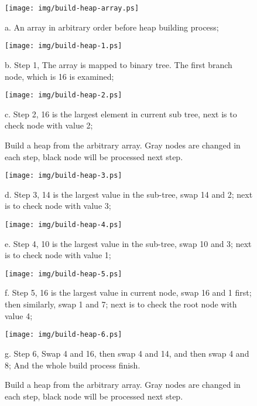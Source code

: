 \documentclass{article}
\begin{document}
\begin{figure}[htbp]
  \begin{center}
    \texttt{[image: img/build-heap-array.ps]}

    a. An array in arbitrary order before heap building process;

    \texttt{[image: img/build-heap-1.ps]}

    b. Step 1, The array is mapped to binary tree. The first branch node, which is
16 is examined;

    \texttt{[image: img/build-heap-2.ps]}

    c. Step 2, 16 is the largest element in current sub tree, next is to check node
with value 2;

    \caption{Build a heap from the arbitrary array. Gray nodes are changed in each step,
black node will be processed next step.} \label{fig:build-heap-1}
  \end{center}
\end{figure}

\begin{figure}[htbp]
  \begin{center}
    \texttt{[image: img/build-heap-3.ps]}

    d. Step 3, 14 is the largest value in the sub-tree, swap 14 and 2; next is to check
node with value 3;

    \texttt{[image: img/build-heap-4.ps]}

    e. Step 4, 10 is the largest value in the sub-tree, swap 10 and 3; next is to check
node with value 1;

    \texttt{[image: img/build-heap-5.ps]}

    f. Step 5, 16 is the largest value in current node, swap 16 and 1 first; then
similarly, swap 1 and 7; next is to check the root node with value 4;

    \texttt{[image: img/build-heap-6.ps]}

    g. Step 6, Swap 4 and 16, then swap 4 and 14, and then swap 4 and 8;
And the whole build process finish.

    \caption{Build a heap from the arbitrary array. Gray nodes are changed in each step,
black node will be processed next step.} \label{fig:build-heap-2}
  \end{center}
\end{figure}

\end{document}
